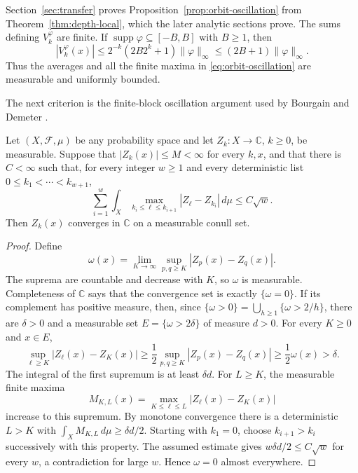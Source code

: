 Section~\ref{sec:transfer} proves Proposition~\ref{prop:orbit-oscillation}
from Theorem~\ref{thm:depth-local}, which the later analytic sections prove.
The sums defining \(V_k^\varphi\) are finite.  If
\(\operatorname{supp}\varphi\subseteq[-B,B]\) with \(B\geq1\), then
\begin{equation}
 |V_k^\varphi(x)|
 \leq 2^{-k}(2B2^k+1)\|\varphi\|_\infty
 \leq(2B+1)\|\varphi\|_\infty.
 \label{eq:smooth-uniform-bound}
\end{equation}
Thus the averages and all the finite maxima in
\eqref{eq:orbit-oscillation} are measurable and uniformly bounded.

The next criterion is the finite-block oscillation argument used by
Bourgain and Demeter \cite{Bourgain1989,Demeter2007}.
\begin{lemma}
\label{lem:ergodic-cauchy}
Let \((X,\mathcal F,\mu)\) be any probability space and let
\(Z_k:X\to\mathbb C\), \(k\geq0\), be measurable.  Suppose that
\(|Z_k(x)|\leq M<\infty\) for every \(k,x\), and that there is
\(C<\infty\) such that, for every integer \(w\geq1\) and every
deterministic list \(0\leq k_1<\cdots<k_{w+1}\),
\[
 \sum_{i=1}^w\int_X
   \max_{k_i\leq\ell\leq k_{i+1}}|Z_\ell-Z_{k_i}|\,d\mu
       \leq C\sqrt w.
\]
Then \(Z_k(x)\) converges in \(\mathbb C\) on a measurable conull set.
\end{lemma}

\begin{proof}
Define
\[
 \omega(x)=\lim_{K\to\infty}\sup_{p,q\geq K}|Z_p(x)-Z_q(x)|.
\]
The suprema are countable and decrease with \(K\), so \(\omega\) is
measurable.  Completeness of \(\mathbb C\) says that the convergence set
is exactly \(\{\omega=0\}\).  If its complement has positive measure,
then, since
\(\{\omega>0\}=\bigcup_{h\geq1}\{\omega>2/h\}\), there are
\(\delta>0\) and a measurable set
\(E=\{\omega>2\delta\}\) of measure \(d>0\).  For every \(K\geq0\) and
\(x\in E\),
\[
 \sup_{\ell\geq K}|Z_\ell(x)-Z_K(x)|
 \geq\frac12\sup_{p,q\geq K}|Z_p(x)-Z_q(x)|
 \geq\frac12\omega(x)>\delta.
\]
The integral of the first supremum is at least \(\delta d\).
For \(L\geq K\), the measurable finite maxima
\[
 M_{K,L}(x)=\max_{K\leq\ell\leq L}|Z_\ell(x)-Z_K(x)|
\]
increase to this supremum.  By monotone convergence there is a
deterministic \(L>K\) with \(\int_XM_{K,L}\,d\mu\geq\delta d/2\).
Starting with \(k_1=0\), choose \(k_{i+1}>k_i\) successively with this
property.  The assumed estimate gives
\(w\delta d/2\leq C\sqrt w\) for every \(w\), a contradiction for large
\(w\).  Hence \(\omega=0\) almost everywhere.
\end{proof}

